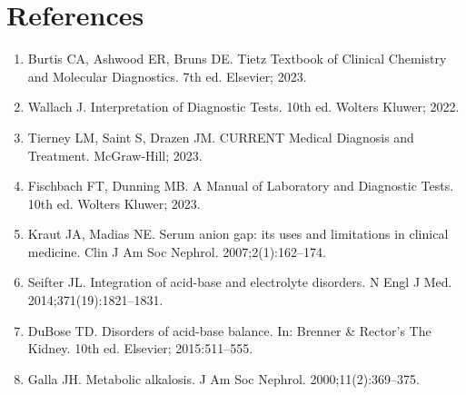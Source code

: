 \section*{References}
\begin{enumerate}
  \item Burtis CA, Ashwood ER, Bruns DE. Tietz Textbook of Clinical Chemistry and Molecular Diagnostics. 7th ed. Elsevier; 2023.
  \item Wallach J. Interpretation of Diagnostic Tests. 10th ed. Wolters Kluwer; 2022.
  \item Tierney LM, Saint S, Drazen JM. CURRENT Medical Diagnosis and Treatment. McGraw-Hill; 2023.
  \item Fischbach FT, Dunning MB. A Manual of Laboratory and Diagnostic Tests. 10th ed. Wolters Kluwer; 2023.
  \item Kraut JA, Madias NE. Serum anion gap: its uses and limitations in clinical medicine. Clin J Am Soc Nephrol. 2007;2(1):162--174.
  \item Seifter JL. Integration of acid-base and electrolyte disorders. N Engl J Med. 2014;371(19):1821--1831.
  \item DuBose TD. Disorders of acid-base balance. In: Brenner \& Rector's The Kidney. 10th ed. Elsevier; 2015:511--555.
  \item Galla JH. Metabolic alkalosis. J Am Soc Nephrol. 2000;11(2):369--375.
\end{enumerate}

\clearpage
